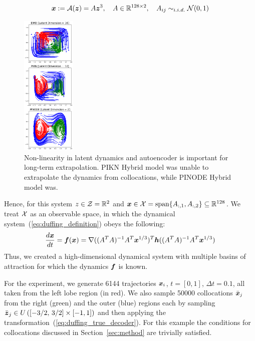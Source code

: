 \begin{equation}
    \label{eq:duffing_true_decoder}
    \boldsymbol{x} := \mathcal{A}(\boldsymbol{z}) = A\boldsymbol{z}^3, \quad A \in \mathbb{R}^{128 \times 2}, \quad A_{ij} \sim_{i.i.d.} \mathcal{N}(0, 1)
\end{equation}

\begin{figure}
  \begin{center}
    \includegraphics[width=0.23\textwidth]{figures/duffing_comparison.pdf}
  \end{center}
  \caption{Non-linearity in latent dynamics and autoencoder is important for long-term extrapolation. PIKN Hybrid model was unable to extrapolate the dynamics from collocations, while PINODE Hybrid model was.}%
  \label{fig:duffing_comparison}
\end{figure}
Hence, for this system $z \in \operatorname{\mathcal{Z}} = \mathbb{R}^2$ and $\boldsymbol{x} \in \operatorname{\mathcal{X}} = \text{span}\{A_{:,1}, A_{:,2}\} \subseteq \mathbb{R}^{128}$. We treat $\operatorname{\mathcal{X}}$ as an observable space, in which the dynamical system~(\ref{eq:duffing_definition}) obeys the following:
\begin{equation}
    \frac{d\boldsymbol{x}}{dt} = \boldsymbol{f}(\boldsymbol{x}) = \nabla((A^TA)^{-1}A^T\boldsymbol{x}^{1/3})^T\boldsymbol{h}((A^TA)^{-1}A^T\boldsymbol{x}^{1/3})
\end{equation}
Thus, we created a high-dimensional dynamical system with multiple basins of attraction for which the dynamics $\boldsymbol{f}$ is known.


For the experiment, we generate 6144 trajectories $\boldsymbol{x}_i$, $t=[0, 1]$, $\Delta t = 0.1$, all taken from the left lobe region (in red). We also sample 50000 collocations $\bar{\boldsymbol{x}}_j$ from the right (green) and the outer (blue) regions each by sampling $\bar{\boldsymbol{z}}_j \in U\left([-3/2,\, 3/2] \times [-1, 1]\right)$ and then applying the transformation~(\ref{eq:duffing_true_decoder}). For this example the conditions for collocations discussed in Section~\ref{sec:method} are trivially satisfied.


